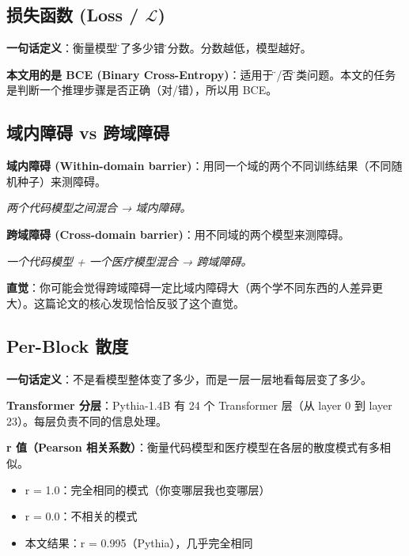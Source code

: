 \documentclass[12pt,a4paper]{article}
\begin{document}
\subsection{损失函数 (Loss / $\mathcal{L}$)}

\begin{conceptbox}
\textbf{一句话定义}：衡量模型\"犯了多少错\"的分数。分数越低，模型越好。

\textbf{本文用的是 BCE (Binary Cross-Entropy)}：适用于\"是/否\"分类问题。本文的任务是判断一个推理步骤是否正确（对/错），所以用 BCE。
\end{conceptbox}

\subsection{域内障碍 vs 跨域障碍}

\begin{conceptbox}
\textbf{域内障碍 (Within-domain barrier)}：用同一个域的两个不同训练结果（不同随机种子）来测障碍。

\textit{两个代码模型之间混合 → 域内障碍。}

\textbf{跨域障碍 (Cross-domain barrier)}：用不同域的两个模型来测障碍。

\textit{一个代码模型 + 一个医疗模型混合 → 跨域障碍。}

\textbf{直觉}：你可能会觉得跨域障碍一定比域内障碍大（两个学不同东西的人差异更大）。这篇论文的核心发现恰恰反驳了这个直觉。
\end{conceptbox}

\subsection{Per-Block 散度}

\begin{conceptbox}
\textbf{一句话定义}：不是看模型整体变了多少，而是一层一层地看每层变了多少。

\textbf{Transformer 分层}：Pythia-1.4B 有 24 个 Transformer 层（从 layer 0 到 layer 23）。每层负责不同的信息处理。

\textbf{r 值（Pearson 相关系数）}：衡量代码模型和医疗模型在各层的散度模式有多相似。
\begin{itemize}
    \item r = 1.0：完全相同的模式（你变哪层我也变哪层）
    \item r = 0.0：不相关的模式
    \item 本文结果：r = 0.995（Pythia），几乎完全相同
\end{itemize}
\end{conceptbox}
\end{document}
